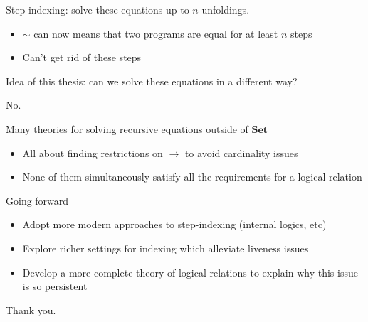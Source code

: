 \documentclass{beamer}
\newcommand{\SET}{\ensuremath{\mathbf{Set}}}
\begin{document}
\begin{frame}
  Step-indexing: solve these equations up to $n$ unfoldings.

  \begin{itemize}
  \item $\sim$ can now means that two programs are equal for at least
    $n$ steps
  \item Can't get rid of these steps
  \end{itemize}
\end{frame}

\begin{frame}
  \centering
  Idea of this thesis: can we solve these equations in a different
  way?

  \pause
  \bigskip

  No.
\end{frame}

\begin{frame}
  Many theories for solving recursive equations outside of $\SET$
  \begin{itemize}
  \item All about finding restrictions on $\to$ to avoid cardinality
    issues
  \item None of them simultaneously satisfy all the requirements for a
    logical relation
  \end{itemize}
\end{frame}

\begin{frame}
  \centering
  Going forward
  \begin{itemize}
  \item Adopt more modern approaches to step-indexing (internal
    logics, etc)
  \item Explore richer settings for indexing which alleviate liveness
    issues
  \item Develop a more complete theory of logical relations to explain
    why this issue is so persistent
  \end{itemize}
  \pause
  \bigskip
  Thank you.
\end{frame}
\end{document}
